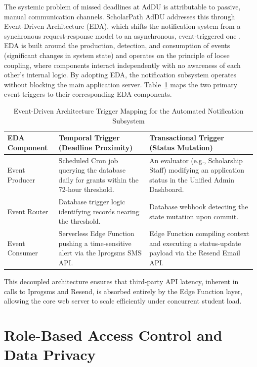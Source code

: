 The systemic problem of missed deadlines at AdDU is attributable to passive, manual communication channels. ScholarPath AdDU addresses this through Event-Driven Architecture (EDA), which shifts the notification system from a synchronous request-response model to an asynchronous, event-triggered one \cite{ref28}. EDA is built around the production, detection, and consumption of events (significant changes in system state) and operates on the principle of loose coupling, where components interact independently with no awareness of each other's internal logic. By adopting EDA, the notification subsystem operates without blocking the main application server. Table~\ref{tab:eda} maps the two primary event triggers to their corresponding EDA components. \begin{table}[htbp]
  \centering
  \small
  \begin{tabular}{@{}p{3.0cm} p{5.4cm} p{5.4cm}@{}}
    \toprule
    EDA Component & Temporal Trigger (Deadline Proximity) & Transactional Trigger (Status Mutation) \\
    \midrule
    Event Producer & Scheduled Cron job querying the database daily for grants within the 72-hour threshold. & An evaluator (e.g., Scholarship Staff) modifying an application status in the Unified Admin Dashboard. \\
    \addlinespace
    Event Router & Database trigger logic identifying records nearing the threshold. & Database webhook detecting the state mutation upon commit. \\
    \addlinespace
    Event Consumer & Serverless Edge Function pushing a time-sensitive alert via the Iprogsms SMS API. & Edge Function compiling context and executing a status-update payload via the Resend Email API. \\
    \bottomrule
  \end{tabular}
  \caption{Event-Driven Architecture Trigger Mapping for the Automated Notification Subsystem}
  \label{tab:eda}
\end{table}
 This decoupled architecture ensures that third-party API latency, inherent in calls to Iprogsms and Resend, is absorbed entirely by the Edge Function layer, allowing the core web server to scale efficiently under concurrent student load.

\section{Role-Based Access Control and Data Privacy}

